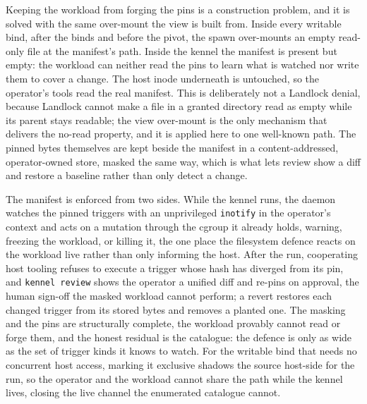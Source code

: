 Keeping the workload from forging the pins is a construction problem,
and it is solved with the same over-mount the view is built from. Inside
every writable bind, after the binds and before the pivot, the spawn
over-mounts an empty read-only file at the manifest's path. Inside the
kennel the manifest is present but empty: the workload can neither read
the pins to learn what is watched nor write them to cover a change. The
host inode underneath is untouched, so the operator's tools read the
real manifest. This is deliberately not a Landlock denial, because
Landlock cannot make a file in a granted directory read as empty while
its parent stays readable; the view over-mount is the only mechanism
that delivers the no-read property, and it is applied here to one
well-known path. The pinned bytes themselves are kept beside the
manifest in a content-addressed, operator-owned store, masked the same
way, which is what lets review show a diff and restore a baseline rather
than only detect a change.

The manifest is enforced from two sides. While the kennel runs, the
daemon watches the pinned triggers with an unprivileged \texttt{inotify}
in the operator's context and acts on a mutation through the cgroup it
already holds, warning, freezing the workload, or killing it, the one
place the filesystem defence reacts on the workload live rather than
only informing the host. After the run, cooperating host tooling refuses
to execute a trigger whose hash has diverged from its pin, and
\texttt{kennel\ review} shows the operator a unified diff and re-pins on
approval, the human sign-off the masked workload cannot perform; a
revert restores each changed trigger from its stored bytes and removes a
planted one. The masking and the pins are structurally complete, the
workload provably cannot read or forge them, and the honest residual is
the catalogue: the defence is only as wide as the set of trigger kinds
it knows to watch. For the writable bind that needs no concurrent host
access, marking it exclusive shadows the source host-side for the run,
so the operator and the workload cannot share the path while the kennel
lives, closing the live channel the enumerated catalogue cannot.
